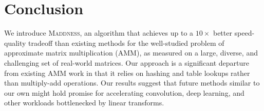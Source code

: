 \documentclass{article}  %
\newcommand{\ours}{\textsc{Maddness}}
\begin{document}
\section{Conclusion}



We introduce \ours, an algorithm that achieves up to a $10\times$ better speed-quality tradeoff than existing methods for the well-studied problem of approximate matrix multiplication (AMM), as measured on a large, diverse, and challenging set of real-world matrices. Our approach is a significant departure from existing AMM work in that it relies on hashing and table lookups rather than multiply-add operations. Our results suggest that future methods similar to our own might hold promise for accelerating convolution, deep learning, and other workloads bottlenecked by linear transforms.



\end{document}
